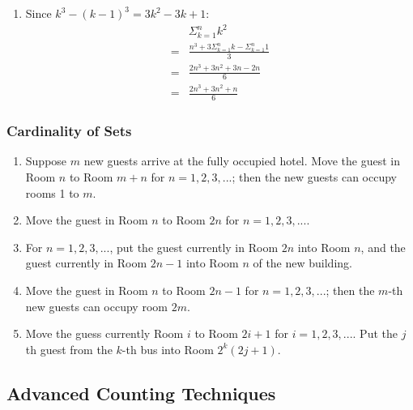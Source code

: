 \documentclass{sig-alternate-05-2015}
\begin{document}
\begin{enumerate}
\item Since $k^3 - (k - 1)^3 = 3k^2 - 3k + 1$:
\begin{align}
	& \Sigma_{k = 1}^n k^2\\
	= & \frac{n^3 + 3\Sigma_{k = 1}^n k - \Sigma_{k = 1}^n 1}{3}\\
	= & \frac{2n^3 + 3n^2 + 3n - 2n}{6}\\
	= & \frac{2n^3 + 3n^2 + n}{6}
\end{align}
\end{enumerate}
\subsubsection{Cardinality of Sets}
\begin{enumerate}
\item Suppose $m$
new guests arrive at the fully occupied hotel. Move the guest
in Room $n$ to Room $m + n$ for $n = 1, 2, 3, ...$; then the new
guests can occupy rooms 1 to $m$.
\item Move the guest
in Room $n$ to Room $2n$ for $n = 1, 2, 3, ...$.
\item For $n = 1, 2, 3, ...$, put the guest currently in Room $2n$ into Room $n$, and the guest
currently in Room $2n - 1$ into Room $n$ of the new building.
\item Move the guest
in Room $n$ to Room $2n - 1$ for $n = 1, 2, 3, ...$; then the $m$-th new guests can occupy room $2m$.
\item Move the guess currently Room $i$ to Room $2i + 1$ for $i = 1, 2, 3, ...$. Put the $j$ th guest from the $k$-th bus into
Room $2^k(2j + 1)$.
\end{enumerate}

\subsection{Advanced Counting Techniques}
\end{document}
